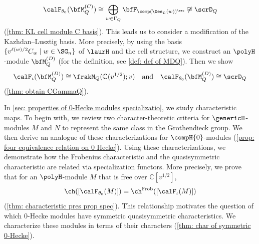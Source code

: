 \documentclass[12pt, reqno]{amsart}
\theoremstyle{plain}
\theoremstyle{definition}
\numberwithin{equation}{section}
\numberwithin{figure}{section}
\numberwithin{table}{section}
\def\C{\mathbb C}
\begin{document}
\[
\calF_{\theta_0}(\bfM^{(C)}_Q)
\cong \bigoplus_{w \in \Gamma_Q} \bfF_{\comp(\Des_L(w))^\rmc} \not\cong \scrD_Q
\]
(\cref{thm: KL cell module C basis}).
This leads us to consider  a modification  of the Kazhdan--Lusztig basis.
More precisely, by using the basis $\{v^{\ell(w)/2} C_w \mid w \in \SG_n\}$ of $\laurH$ and the cell structure, 
 we construct an  $\polyH$-module $\bfM_Q^{(D)}$
  (for the definition, see \cref{def: def of MDQ}).
Then we show  
\begin{align*}
\calF_{\iota}(\bfM^{(D)}_Q)
\cong \frakM_Q(\C(v^{1/2});v) \quad \text{and} \quad
\calF_{\theta_0}(\bfM^{(D)}_Q)
\cong \scrD_Q
\end{align*}
(\cref{thm: obtain CGammaQ}). 



In \cref{sec: properties of 0-Hecke modules specializatio}, we study characteristic maps.
To begin with, we review two character-theoretic criteria for $\genericH$-modules $M$ and $N$ to represent the same class in the Grothendieck group.
We then derive an analogue of these characterizations for $\compH{0}$-modules (\cref{prop: four equivalence relation on 0 Hecke}).
Using these characterizations, we demonstrate how the Frobenius characteristic and the quasisymmetric characteristic are related via specialization functors.
More precisely, we prove that for an $\polyH$-module $M$ that is free over $\C[v^{1/2}]$,
\[
\ch([\calF_{\theta_0}(M)])=\ch^{\rm Frob}([\calF_{\iota}(M)])
\]
(\cref{thm: characteristic pres prop spec}).
This relationship motivates the question of which $0$-Hecke modules have symmetric quasisymmetric characteristics.
We characterize these modules in terms of their characters (\cref{thm: char of symmetric 0-Hecke}).
\end{document}
